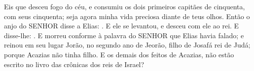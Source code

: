 {{  Eis que desceu fogo do céu, e consumiu os dois primeiros capitães de cinquenta, com seus cinquenta; seja agora minha vida preciosa diante de teus olhos}.
  Então o anjo do SENHOR disse a Elias: . E ele se levantou, e desceu com ele ao rei.
  E disse-lhe: .
  E morreu conforme à palavra do SENHOR que Elias havia falado; e reinou em seu lugar Jorão, no segundo ano de Jeorão, filho de Josafá rei de Judá; porque Acazias não tinha filho.
  E os demais dos feitos de Acazias, não estão escrito no livro das crônicas dos reis de Israel?
\par }


